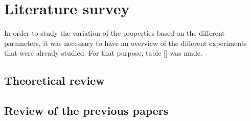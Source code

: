 \documentclass[12pt,a4paper]{article}
\begin{document}
\section{Literature survey}


In order to study the variation of the properties based on the different parameters, it was necessary to have an overview of the different experiments that were already studied. For that purpose, table [] was made.
\subsection*{Theoretical review} 

\subsection*{Review of the previous papers}
\end{document}
